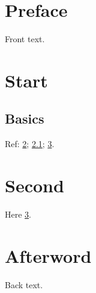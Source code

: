 \documentclass{test-thechap-class}
\begin{document}
\frontmatter
\chapter{Preface}\label{preface}
Front text.
\tableofcontents
\mainmatter
\chapter{Start}\label{start}
\section{Basics}\label{basics}
Ref: \ref{start}; \ref{basics}; \ref{second}.
\chapter{Second}\label{second}
Here \ref{second}.
\backmatter
\chapter{Afterword}\label{afterword}
Back text.
\end{document}

